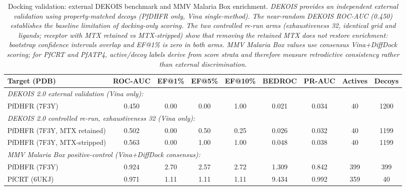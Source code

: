 
\begin{table}[!htbp]
\centering
\caption{Docking validation: external DEKOIS benchmark and MMV Malaria Box enrichment. \textit{DEKOIS provides an independent external validation using property-matched decoys (PfDHFR only, Vina single-method). The near-random DEKOIS ROC-AUC (0.450) establishes the baseline limitation of docking-only scoring. The two controlled re-run arms (exhaustiveness 32, identical grid and ligands; receptor with MTX retained vs MTX-stripped) show that removing the retained MTX does not restore enrichment: bootstrap confidence intervals overlap and EF@1\% is zero in both arms. MMV Malaria Box values use consensus Vina+DiffDock scoring; for PfCRT and PfATP4, active/decoy labels derive from score strata and therefore measure retrodictive consistency rather than external discrimination.}}
\label{tab:sm_enrichment_validation}
\scriptsize
\begin{tabular}{lcccccccc}
\toprule
\textbf{Target (PDB)} & \textbf{ROC-AUC} & \textbf{EF@1\%} & \textbf{EF@5\%} & \textbf{EF@10\%} & \textbf{BEDROC} & \textbf{PR-AUC} & \textbf{Actives} & \textbf{Decoys} \\
\midrule
\multicolumn{9}{l}{\textit{DEKOIS 2.0 external validation (Vina only):}} \\
PfDHFR (7F3Y) & \num{0.450} & \num{0.00} & \num{0.00} & \num{1.00} & \num{0.021} & \num{0.034} & \num{40} & \num{1200} \\
\multicolumn{9}{l}{\textit{DEKOIS 2.0 controlled re-run, exhaustiveness 32 (Vina only):}} \\
PfDHFR (7F3Y, MTX retained) & \num{0.502} & \num{0.00} & \num{0.50} & \num{0.25} & \num{0.026} & \num{0.032} & \num{40} & \num{1199} \\
PfDHFR (7F3Y, MTX-stripped) & \num{0.563} & \num{0.00} & \num{1.00} & \num{1.00} & \num{0.048} & \num{0.038} & \num{40} & \num{1199} \\
\midrule
\multicolumn{9}{l}{\textit{MMV Malaria Box positive-control (Vina+DiffDock consensus):}} \\
PfDHFR (7F3Y) & \num{0.924} & \num{2.70} & \num{2.57} & \num{2.72} & \num{1.309} & \num{0.842} & \num{399} & \num{399} \\
PfCRT (6UKJ) & \num{0.971} & \num{1.11} & \num{1.11} & \num{1.11} & \num{9.434} & \num{0.992} & \num{359} & \num{40} \\

\end{tabular}
\end{table}
